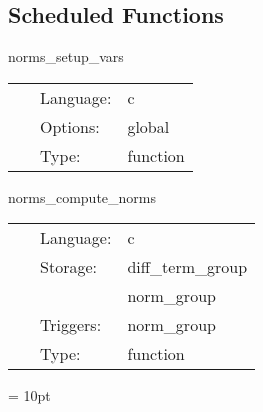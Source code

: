 \subsection*{Scheduled Functions}
\vspace{5mm}


\hspace{5mm} norms\_setup\_vars 

\hspace{5mm}{\it check norm\_type and setup the vars info } 


\hspace{5mm}

 \begin{tabular*}{160mm}{cll} 
~ & Language:  & c \\ 
~ & Options:  & global \\ 
~ & Type:  & function \\ 
\end{tabular*} 


\vspace{5mm}


\hspace{5mm} norms\_compute\_norms 

\hspace{5mm}{\it compute the norm } 


\hspace{5mm}

 \begin{tabular*}{160mm}{cll} 
~ & Language:  & c \\ 
~ & Storage:  & diff\_term\_group \\ 
~& ~ &norm\_group\\ 
~ & Triggers:  & norm\_group \\ 
~ & Type:  & function \\ 
\end{tabular*} 



\vspace{5mm}\parskip = 10pt 

